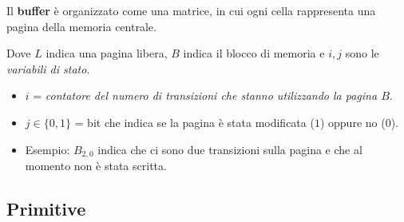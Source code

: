 \documentclass[11pt]{report}
\begin{document}
Il \textbf{buffer} \`e organizzato come una matrice, in cui ogni cella rappresenta una pagina della memoria centrale.
\begin{multicols}{2}
\begin{center}
\end{center}

\newcolumn
\noindent Dove $L$ indica una pagina libera, $B$ indica il blocco di memoria e $i, j$ sono le \emph{variabili di stato}.
\begin{itemize}
\item $i$ = \emph{contatore del numero di transizioni che stanno utilizzando la pagina $B$}.
\item $j \in \{0,1\}$ = bit che indica se la pagina \`e stata modificata ($1$) oppure no ($0$).
\item Esempio: $B_{2,0}$ indica che ci sono due transizioni sulla pagina e che al momento non \`e stata scritta.
\end{itemize}
\end{multicols}

\subsection{Primitive}
\end{document}
